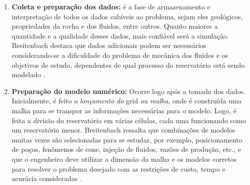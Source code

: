 \begin{enumerate}
\item \textbf{Coleta e prepara\c{c}\~{a}o dos dados:} \'{e} a fase de armazenamento e interpreta\c{c}\~{a}o de todos os dados cab\'{i}veis ao problema, sejam eles geol\'{o}gicos, propriedades da rocha e dos fluidos, entre outros. Quanto maiores a quantidade e a qualidade desses dados, mais confi\'{a}vel ser\'{a} a simula\c{c}\~{a}o. Breitenbach destaca que dados adicionais podem ser necess\'{a}rios considerando-se a dificuldade do problema de mec\^{a}nica dos fluidos e os objetivos de estudo, dependentes de qual processo do reservat\'{o}rio est\'{a} sendo modelado \cite{breitenbach1991}.
\item \textbf{Prepara\c{c}\~{a}o do modelo num\'{e}rico:} Ocorre logo ap\'{o}s a tomada dos dados. Inicialmente, \'{e} feito o \textit{lan\c{c}amento do} grid \textit{ou malha}, onde \'{e} constru\'{i}da uma malha para se transpor as informa\c{c}\~{o}es necess\'{a}rias para o modelo. Logo, \'{e} feita a divis\~{a}o do reservat\'{o}rio em v\'{a}rias c\'{e}lulas, cada uma funcionando como um reservat\'{o}rio menor. Breitenbach ressalta que combina\c{c}\~{o}es de modelos muitas vezes s\~{a}o selecionadas para se estudar, por exemplo, posicionamento de po\c{c}os, fen\^{o}menos de cone, inje\c{c}\~{a}o de fluidos, vaz\~{o}es de produ\c{c}\~{a}o, etc., e que o engenheiro deve utilizar a dimens\~{a}o da malha e os modelos corretos para resolver o problema desejado com as restri\c{c}\~{o}es de custo, tempo e acur\'{a}cia consideradas \cite{breitenbach1991}.


\end{enumerate}
